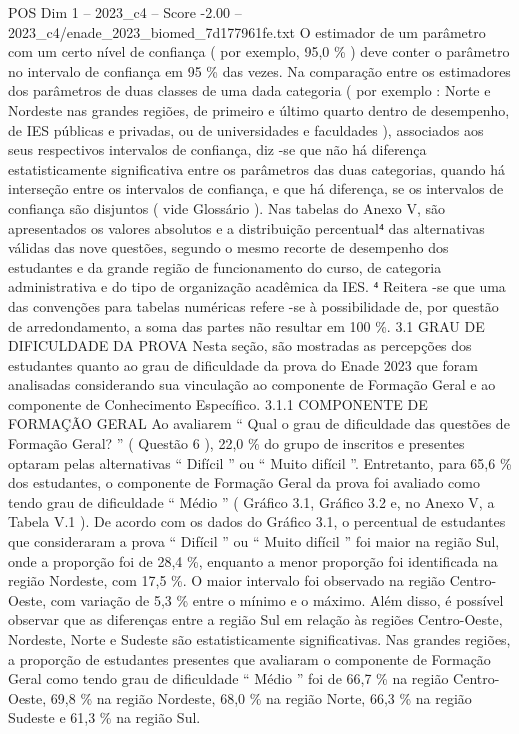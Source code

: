 \begin{textsample}{POS Dim 1 – 2023\_c4 – Score -2.00 – 2023\_c4/enade\_2023\_biomed\_7d177961fe.txt}
O estimador de um parâmetro com um certo nível de confiança ( por exemplo, 95,0 \% ) deve conter o parâmetro no intervalo de confiança em 95 \% das vezes.
Na comparação entre os estimadores dos parâmetros de duas classes de uma dada categoria ( por exemplo : Norte e Nordeste nas grandes regiões, de primeiro e último quarto dentro de desempenho, de IES públicas e privadas, ou de universidades e faculdades ), associados aos seus respectivos intervalos de confiança, diz -se que não há diferença estatisticamente significativa entre os parâmetros das duas categorias, quando há interseção entre os intervalos de confiança, e que há diferença, se os intervalos de confiança são disjuntos ( vide Glossário ).
Nas tabelas do Anexo V, são apresentados os valores absolutos e a distribuição percentual⁴ das alternativas válidas das nove questões, segundo o mesmo recorte de desempenho dos estudantes e da grande região de funcionamento do curso, de categoria administrativa e do tipo de organização acadêmica da IES. ⁴ Reitera -se que uma das convenções para tabelas numéricas refere -se à possibilidade de, por questão de arredondamento, a soma das partes não resultar em 100 \%. 3.1 GRAU DE DIFICULDADE DA PROVA Nesta seção, são mostradas as percepções dos estudantes quanto ao grau de dificuldade da prova do Enade 2023 que foram analisadas considerando sua vinculação ao componente de Formação Geral e ao componente de Conhecimento Específico. 3.1.1 COMPONENTE DE FORMAÇÃO GERAL Ao avaliarem “ Qual o grau de dificuldade das questões de Formação Geral? ” ( Questão 6 ), 22,0 \% do grupo de inscritos e presentes optaram pelas alternativas “ Difícil ” ou “ Muito difícil ”.
Entretanto, para 65,6 \% dos estudantes, o componente de Formação Geral da prova foi avaliado como tendo grau de dificuldade “ Médio ” ( Gráfico 3.1, Gráfico 3.2 e, no Anexo V, a Tabela V.1 ).
De acordo com os dados do Gráfico 3.1, o percentual de estudantes que consideraram a prova “ Difícil ” ou “ Muito difícil ” foi maior na região Sul, onde a proporção foi de 28,4 \%, enquanto a menor proporção foi identificada na região Nordeste, com 17,5 \%.
O maior intervalo foi observado na região Centro-Oeste, com variação de 5,3 \% entre o mínimo e o máximo.
Além disso, é possível observar que as diferenças entre a região Sul em relação às regiões Centro-Oeste, Nordeste, Norte e Sudeste são estatisticamente significativas.
Nas grandes regiões, a proporção de estudantes presentes que avaliaram o componente de Formação Geral como tendo grau de dificuldade “ Médio ” foi de 66,7 \% na região Centro-Oeste, 69,8 \% na região Nordeste, 68,0 \% na região Norte, 66,3 \% na região Sudeste e 61,3 \% na região Sul.

\end{textsample}
